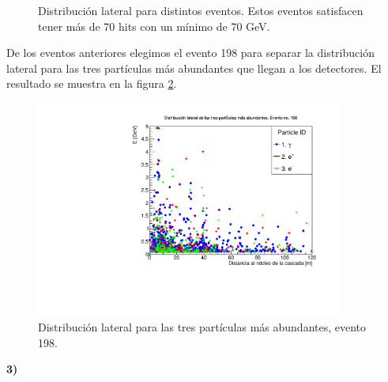 \documentclass[11pt]{article}
\begin{document}
\begin{figure}[H]
\centering 
{}
\caption{Distribución lateral para distintos eventos. Estos eventos satisfacen tener más de 70 hits con un mínimo de 70 GeV.}
\label{fig:Prob2A}
\end{figure}
De los eventos anteriores elegimos el evento 198 para separar la distribución lateral para las tres partículas más abundantes que llegan a los detectores. El resultado se muestra en la figura \ref{fig:Prob2B}.
\begin{figure}[H]
\centering
\includegraphics[width=0.9\textwidth]{../Figuras/Prob2D.pdf}
\caption{Distribución lateral para las tres partículas más abundantes, evento 198.}
\label{fig:Prob2B}
\end{figure}
\pagebreak
\textbf{3)}
\end{document}
